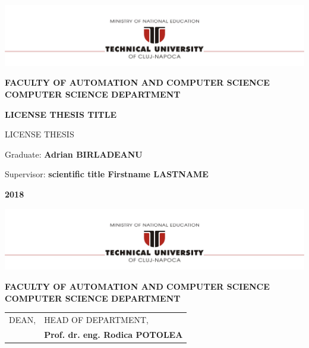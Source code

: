 \documentclass[12pt,a4paper,twoside]{report}
\renewcommand{\thesisyear}{2018}      %
\renewcommand{\thesistitle}{LICENSE THESIS TITLE}
\renewcommand{\thesissupervisor}{scientific title Firstname LASTNAME}
\newcommand{\department}{\bf FACULTY OF AUTOMATION AND COMPUTER SCIENCE\\
COMPUTER SCIENCE DEPARTMENT}
\newcommand{\utcnlogo}{\includegraphics[width=15cm]{img/tucn.jpg}}
\begin{document}

\newenvironment{definition}[1][Defini\c{t}ie.]{\begin{trivlist}
\item[\hskip \labelsep {\bfseries #1}]}{\end{trivlist}}




\setcounter{page}{4}



\begin{center}
\utcnlogo

\department

\vspace{4cm}

{\bf \thesistitle} %

\vspace{1.5cm}

LICENSE THESIS

\vspace{6cm}

Graduate: {\bf Adrian BIRLADEANU}

Supervisor: {\bf \thesissupervisor}

\vspace{3cm}
{\bf \thesisyear}
\end{center}

\thispagestyle{empty}
\newpage

\begin{center}
\utcnlogo

\department

\end{center}
\vspace{0.5cm}

\begin{tabular}{p{7cm}p{8cm}}
 \hspace{-1cm}DEAN, & HEAD OF DEPARTMENT,\\
 \hspace{-1cm}{\bf Prof. dr. eng. Liviu MICLEA} & {\bf Prof. dr. eng. Rodica POTOLEA}\\  
\end{tabular}
 
\end{document}
